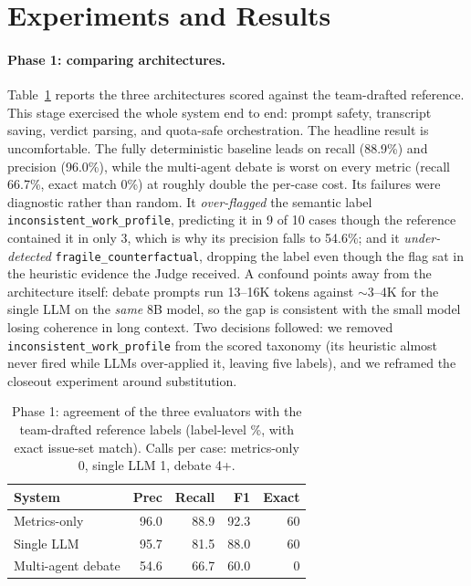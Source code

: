 \documentclass[letterpaper]{article}
\begin{document}
\section{Experiments and Results}
\paragraph{Phase 1: comparing architectures.}
Table~\ref{tab:systems} reports the three architectures scored against the team-drafted reference. This stage exercised the whole system end to end: prompt safety, transcript saving, verdict parsing, and quota-safe orchestration. The headline result is uncomfortable. The fully deterministic baseline leads on recall (88.9\%) and precision (96.0\%), while the multi-agent debate is worst on every metric (recall 66.7\%, exact match 0\%) at roughly double the per-case cost. Its failures were diagnostic rather than random. It \emph{over-flagged} the semantic label \texttt{inconsistent\_work\_profile}, predicting it in 9 of 10 cases though the reference contained it in only 3, which is why its precision falls to 54.6\%; and it \emph{under-detected} \texttt{fragile\_counterfactual}, dropping the label even though the flag sat in the heuristic evidence the Judge received. A confound points away from the architecture itself: debate prompts run 13--16K tokens against ${\sim}3$--4K for the single LLM on the \emph{same} 8B model, so the gap is consistent with the small model losing coherence in long context. Two decisions followed: we removed \texttt{inconsistent\_work\_profile} from the scored taxonomy (its heuristic almost never fired while LLMs over-applied it, leaving five labels), and we reframed the closeout experiment around substitution.

\begin{table}[t]
\centering
\scriptsize
\setlength{\tabcolsep}{5pt}
\caption{Phase 1: agreement of the three evaluators with the team-drafted reference labels (label-level \%, with exact issue-set match). Calls per case: metrics-only 0, single LLM 1, debate 4+.}
\label{tab:systems}
\begin{tabular}{@{}lrrrr@{}}
\toprule
System & Prec & Recall & F1 & Exact \\
\midrule
Metrics-only & 96.0 & 88.9 & 92.3 & 60 \\
Single LLM & 95.7 & 81.5 & 88.0 & 60 \\
Multi-agent debate & 54.6 & 66.7 & 60.0 & 0 \\
\bottomrule
\end{tabular}
\end{table}
\end{document}

